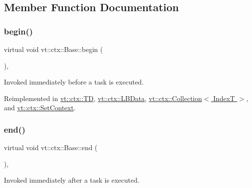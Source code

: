 \subsection{Member Function Documentation}
\mbox{\label{structvt_1_1ctx_1_1_base_aab5524952e1bb163ccba5df64a303168}} 
\subsubsection{\texorpdfstring{begin()}{begin()}}
{\footnotesize\ttfamily virtual void vt\+::ctx\+::\+Base\+::begin (\begin{DoxyParamCaption}{ }\end{DoxyParamCaption})\hspace{0.3cm}{\ttfamily [inline]}, {\ttfamily [virtual]}}



Invoked immediately before a task is executed. 



Reimplemented in \hyperlink{structvt_1_1ctx_1_1_t_d_a5ba29186cd3ac75a48272e0ac050228b}{vt\+::ctx\+::\+TD}, \hyperlink{structvt_1_1ctx_1_1_l_b_data_adf2e7f7e42dae24eb1cc9dca14f4a8a6}{vt\+::ctx\+::\+L\+B\+Data}, \hyperlink{structvt_1_1ctx_1_1_collection_a1555355c83dd6f692c03c66882b74846}{vt\+::ctx\+::\+Collection$<$ Index\+T $>$}, and \hyperlink{structvt_1_1ctx_1_1_set_context_aa882626f5fcf98cd6e8aa61c59395b5a}{vt\+::ctx\+::\+Set\+Context}.

\mbox{\label{structvt_1_1ctx_1_1_base_a113bac732b2831caa8eed11609ccaf0e}} 
\subsubsection{\texorpdfstring{end()}{end()}}
{\footnotesize\ttfamily virtual void vt\+::ctx\+::\+Base\+::end (\begin{DoxyParamCaption}{ }\end{DoxyParamCaption})\hspace{0.3cm}{\ttfamily [inline]}, {\ttfamily [virtual]}}



Invoked immediately after a task is executed. 




